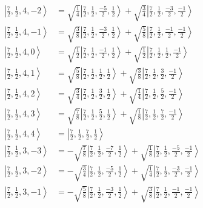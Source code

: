 \documentclass{report}
\newcommand{\ket}[1]{\left| #1 \right>} %
\begin{document}
\begin{align*}
\ket{ \frac{7}{2} ,  \frac{1}{2} ,  4 ,  -2  } &=  \sqrt{  \frac{1}{4}  } \ket{ \frac{7}{2} ,  \frac{1}{2} ,  \frac{-5}{2} ,  \frac{1}{2}  } + \sqrt{  \frac{3}{4}  } \ket{ \frac{7}{2} ,  \frac{1}{2} ,  \frac{-3}{2} ,  \frac{-1}{2}  } \\
\ket{ \frac{7}{2} ,  \frac{1}{2} ,  4 ,  -1  } &=  \sqrt{  \frac{3}{8}  } \ket{ \frac{7}{2} ,  \frac{1}{2} ,  \frac{-3}{2} ,  \frac{1}{2}  } + \sqrt{  \frac{5}{8}  } \ket{ \frac{7}{2} ,  \frac{1}{2} ,  \frac{-1}{2} ,  \frac{-1}{2}  } \\
\ket{ \frac{7}{2} ,  \frac{1}{2} ,  4 ,  0  } &=  \sqrt{  \frac{1}{2}  } \ket{ \frac{7}{2} ,  \frac{1}{2} ,  \frac{-1}{2} ,  \frac{1}{2}  } + \sqrt{  \frac{1}{2}  } \ket{ \frac{7}{2} ,  \frac{1}{2} ,  \frac{1}{2} ,  \frac{-1}{2}  } \\
\ket{ \frac{7}{2} ,  \frac{1}{2} ,  4 ,  1  } &=  \sqrt{  \frac{5}{8}  } \ket{ \frac{7}{2} ,  \frac{1}{2} ,  \frac{1}{2} ,  \frac{1}{2}  } + \sqrt{  \frac{3}{8}  } \ket{ \frac{7}{2} ,  \frac{1}{2} ,  \frac{3}{2} ,  \frac{-1}{2}  } \\
\ket{ \frac{7}{2} ,  \frac{1}{2} ,  4 ,  2  } &=  \sqrt{  \frac{3}{4}  } \ket{ \frac{7}{2} ,  \frac{1}{2} ,  \frac{3}{2} ,  \frac{1}{2}  } + \sqrt{  \frac{1}{4}  } \ket{ \frac{7}{2} ,  \frac{1}{2} ,  \frac{5}{2} ,  \frac{-1}{2}  } \\
\ket{ \frac{7}{2} ,  \frac{1}{2} ,  4 ,  3  } &=  \sqrt{  \frac{7}{8}  } \ket{ \frac{7}{2} ,  \frac{1}{2} ,  \frac{5}{2} ,  \frac{1}{2}  } + \sqrt{  \frac{1}{8}  } \ket{ \frac{7}{2} ,  \frac{1}{2} ,  \frac{7}{2} ,  \frac{-1}{2}  } \\
\ket{ \frac{7}{2} ,  \frac{1}{2} ,  4 ,  4  } &=  \ket{ \frac{7}{2} ,  \frac{1}{2} ,  \frac{7}{2} ,  \frac{1}{2}  } \\
\ket{ \frac{7}{2} ,  \frac{1}{2} ,  3 ,  -3  } &=  - \sqrt{  \frac{7}{8}  } \ket{ \frac{7}{2} ,  \frac{1}{2} ,  \frac{-7}{2} ,  \frac{1}{2}  } + \sqrt{  \frac{1}{8}  } \ket{ \frac{7}{2} ,  \frac{1}{2} ,  \frac{-5}{2} ,  \frac{-1}{2}  } \\
\ket{ \frac{7}{2} ,  \frac{1}{2} ,  3 ,  -2  } &=  - \sqrt{  \frac{3}{4}  } \ket{ \frac{7}{2} ,  \frac{1}{2} ,  \frac{-5}{2} ,  \frac{1}{2}  } + \sqrt{  \frac{1}{4}  } \ket{ \frac{7}{2} ,  \frac{1}{2} ,  \frac{-3}{2} ,  \frac{-1}{2}  } \\
\ket{ \frac{7}{2} ,  \frac{1}{2} ,  3 ,  -1  } &=  - \sqrt{  \frac{5}{8}  } \ket{ \frac{7}{2} ,  \frac{1}{2} ,  \frac{-3}{2} ,  \frac{1}{2}  } + \sqrt{  \frac{3}{8}  } \ket{ \frac{7}{2} ,  \frac{1}{2} ,  \frac{-1}{2} ,  \frac{-1}{2}  } \\

\end{align*}
\end{document}
